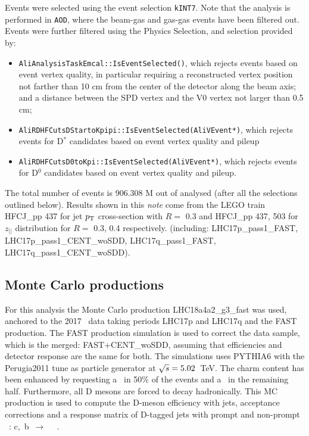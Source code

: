 Events were selected using the event selection \texttt{kINT7}. Note that the analysis is performed in \texttt{AOD}, where the beam-gas and gas-gas events have been filtered out.
Events were further filtered using the Physics Selection, and selection provided by:
\begin{itemize}
\item \texttt{AliAnalysisTaskEmcal::IsEventSelected()}, which rejects events based on event vertex quality, in particular requiring a reconstructed vertex position not farther than 10 cm from the center of the detector along the beam axis; and a distance between the SPD vertex and the V0 vertex not larger than 0.5 cm;
\item \texttt{AliRDHFCutsDStartoKpipi::IsEventSelected(AliVEvent*)}, which rejects events for D$^*$ candidates based on event vertex quality and pileup
\item \texttt{AliRDHFCutsD0toKpi::IsEventSelected(AliVEvent*)}, which rejects events for D$^0$ candidates based on event vertex quality and pileup.
\end{itemize}

The total number of events is 906.308  M  out of  analysed (after all the selections outlined below).
Results shown in this {\it note} come from the LEGO train HFCJ\_pp 437 %
for jet $p_{\text T}$ cross-section with $R=$ 0.3 and HFCJ\_pp 437, 503 %
for $z_{||}$ distribution for $R=$ 0.3, 0.4 %
respectively.
 (including: LHC17p\_pass1\_FAST, LHC17p\_pass1\_CENT\_woSDD, LHC17q\_pass1\_FAST, LHC17q\_pass1\_CENT\_woSDD).

\subsection{Monte Carlo productions}

For this analysis the Monte Carlo production LHC18a4a2\_g3\_fast was used, anchored to the 2017 \pp\ data taking periods LHC17p and LHC17q and the FAST production. The FAST production simulation is used to correct the data sample, which is the merged: FAST+CENT\_woSDD, assuming that efficiencies and detector response are the same for both.
The simulations uses PYTHIA6 with the Perugia2011 tune as particle generator at $\sqrt{s}=5.02$~TeV.
The charm content has been enhanced by requesting a \ccbar\ in 50\% of the events and a \bbbar\ in the remaining half.
Furthermore, all D mesons are forced to decay hadronically.
This MC production is used to compute the D-meson efficiency with jets, acceptance corrections and a response matrix of D-tagged jets with prompt and non-prompt \Dzero\ : c,~b~$\rightarrow$ ~\Dzero\ .


